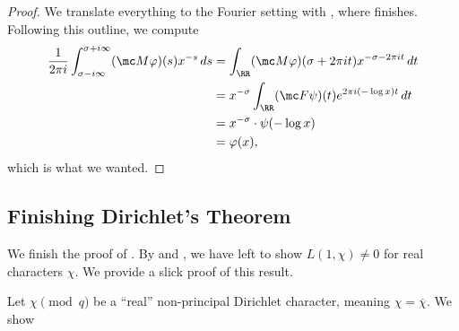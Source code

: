 \documentclass[../notes.tex]{subfiles}
\begin{document}
\begin{proof}
	We translate everything to the Fourier setting with , where  finishes. Following this outline, we compute
	\begin{align*}
		\frac1{2\pi i}\int_{\sigma-i\infty}^{\sigma+i\infty}(\mc M\varphi)(s)x^{-s}\,ds &= \int_\RR (\mc M\varphi)(\sigma+2\pi it)x^{-\sigma-2\pi it}\,dt \\
		&= x^{-\sigma}\int_\RR (\mc F\psi)(t)e^{2\pi i(-\log x)t}\,dt \\
		&= x^{-\sigma}\cdot\psi(-\log x) \\
		&= \varphi(x),
	\end{align*}
	which is what we wanted.
\end{proof}

\subsection{Finishing Dirichlet's Theorem}
We finish the proof of . By  and , we have left to show $L(1,\chi)\ne0$ for real characters $\chi$. We provide a slick proof of this result.
\begin{lemma}
	Let $\chi\pmod q$ be a ``real'' non-principal Dirichlet character, meaning $\chi=\overline\chi$. We show 
\end{lemma}
\end{document}
